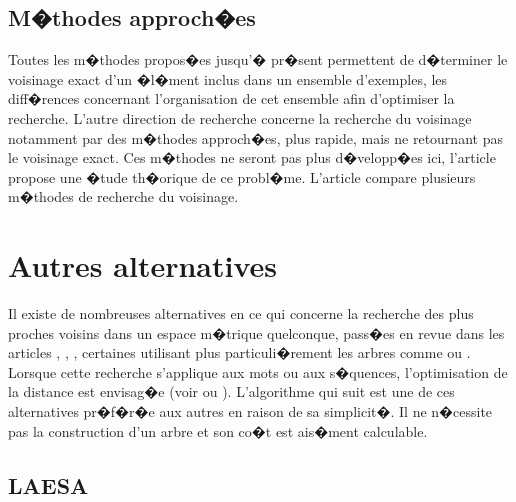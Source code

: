 \subsection{M�thodes approch�es}

Toutes les m�thodes propos�es jusqu'� pr�sent permettent de d�terminer le voisinage exact d'un �l�ment inclus dans un ensemble d'exemples, les diff�rences concernant l'organisation de cet ensemble afin d'optimiser la recherche. L'autre direction de recherche concerne la recherche du voisinage notamment par des m�thodes approch�es, plus rapide, mais ne retournant pas le voisinage exact. Ces m�thodes ne seront pas plus d�velopp�es ici, l'article  propose une �tude th�orique de ce probl�me. L'article  compare plusieurs m�thodes de recherche du voisinage.





















\section{Autres alternatives}

Il existe de nombreuses alternatives en ce qui concerne la recherche des plus proches voisins dans un espace m�trique quelconque, pass�es en revue dans les articles , , , certaines utilisant plus particuli�rement les arbres comme  ou . Lorsque cette recherche s'applique aux mots ou aux s�quences, l'optimisation de la distance est envisag�e (voir  ou ). L'algorithme qui suit est une de ces alternatives pr�f�r�e aux autres en raison de sa simplicit�. Il ne n�cessite pas la construction d'un arbre et son co�t est ais�ment calculable.


\subsection{LAESA}

